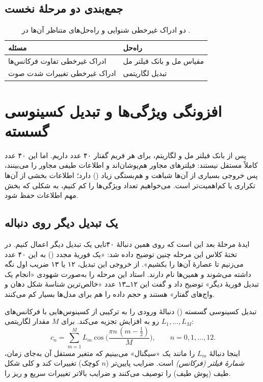 \subsection{جمع‌بندی دو مرحلهٔ نخست}
\begin{table}[htbp]
\centering
\caption{دو ادراک غیرخطی شنوایی و راه‌حل‌های متناظر آن‌ها در .}
\begin{tabular}{p{5.5cm}p{6cm}}
\toprule
\textbf{مسئله} & \textbf{راه‌حل} \\
\midrule
ادراک غیرخطی تفاوت فرکانس‌ها & مقیاس مل و بانک فیلتر مل \\
ادراک غیرخطی تغییرات شدت صوت & تبدیل لگاریتمی \\
\bottomrule
\end{tabular}
\end{table}

\section{افزونگی ویژگی‌ها و تبدیل کسینوسی گسسته}

پس از بانک فیلتر مل و لگاریتم، برای هر فریم گفتار ۴۰ عدد داریم. اما این ۴۰ عدد کاملاً مستقل نیستند: فیلترهای مجاور هم‌پوشان‌اند و اطلاعات طیفی مجاور را می‌بینند، پس خروجی بسیاری از آن‌ها شباهت و هم‌بستگی زیاد () دارد؛ اطلاعات بخشی از آن‌ها تکراری یا کم‌اهمیت‌تر است. می‌خواهیم تعداد ویژگی‌ها را کم کنیم، به شکلی که بخش مهم اطلاعات حفظ شود.

\subsection{یک تبدیل دیگر روی دنباله}
ایدهٔ مرحلهٔ بعد این است که روی همین دنبالهٔ ۴۰تایی یک تبدیل دیگر اعمال کنیم. در تختهٔ کلاس این مرحله چنین توضیح داده شد: «یک فوریهٔ مجدد () به این ۴۰ عدد می‌زنیم تا عصارهٔ آن‌ها را بکشیم». از خروجی این تبدیل، ۱۲ یا ۱۳ ضریب اول نگه داشته می‌شوند و همین‌ها  نام دارند. استاد این مرحله را به‌صورت شهودی «انجام یک تبدیل فوریهٔ دیگر» توضیح داد و گفت این ۱۲ــ۱۳ عدد «خالص‌ترین شناسهٔ شکل دهان و واج‌های گفتار» هستند و حجم داده را هم برای مدل‌ها بسیار کم می‌کنند.

تبدیل کسینوسی گسسته () دنبالهٔ ورودی را به ترکیبی از کسینوس‌هایی با فرکانس‌های رو به افزایش تجزیه می‌کند. برای $M$ مقدار لگاریتمی $L_1,\ldots,L_M$:
\[
c_n=\sum_{m=1}^{M} L_m\cos\!\Big(\frac{\pi n\,(m-\tfrac12)}{M}\Big),\qquad n=0,1,\ldots,12 .
\]
اینجا دنبالهٔ $L_m$ را مانند یک «سیگنال» می‌بینیم که متغیر مستقل آن به‌جای زمان، \emph{شمارهٔ فیلتر (فرکانس)} است. ضرایب پایین‌تر ($n$ کوچک) تغییرات کند و کلی شکل طیف (پوش طیف) را توصیف می‌کنند و ضرایب بالاتر تغییرات سریع و ریز را.

